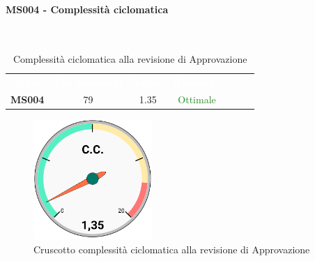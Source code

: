 \paragraph{MS004 - Complessità ciclomatica}\mbox{}\\[0,3cm]
    \begin{table}[H]
        \centering
        \begin{tabular}{ccccccc}
            \rowcolor{greySWEight}
            \textcolor{white}{\textbf{Codice}} &
            \textcolor{white}{\textbf{File analizzati}} &
            \textcolor{white}{\textbf{Valore}}&
            \textcolor{white}{\textbf{Riscontro}}\\
            \textbf{MS004} & 79 & 1.35 & \textcolor{ForestGreen}{Ottimale}\\
        \end{tabular}
        \caption{Complessità ciclomatica alla revisione di Approvazione}
    \end{table}
    \begin{figure}[H]
        \centering
        \includegraphics[width=45mm]{sez/App_Esito/Approvazione/graph/complessitaCiclomatica.pdf}
        \caption{Cruscotto complessità ciclomatica alla revisione di Approvazione}
    \end{figure}


